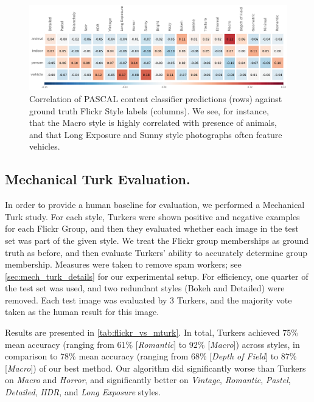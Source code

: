 \begin{figure}[h]
\centering
    \includegraphics[width=\linewidth]{../style/figures/content_correlation2/pascal_on_flickr.pdf}
    \caption[Correlation of PASCAL content classifier predictions against ground truth Flickr Style labels.]{
        Correlation of PASCAL content classifier predictions (rows) against ground truth Flickr Style labels (columns).
        We see, for instance, that the Macro style is highly correlated with presence of animals, and that Long Exposure and Sunny style photographs often feature vehicles.
    }\label{fig:content_correlation}
\end{figure}

\subsection{Mechanical Turk Evaluation.}\label{sec:mech_turk_evaluation}
In order to provide a human baseline for evaluation, we performed a Mechanical Turk study.
For each style, Turkers were shown positive and negative examples for each Flickr Group, and then they evaluated whether each image in the test set was part of the given style.
We treat the Flickr group memberships as ground truth as before, and then evaluate Turkers' ability to accurately determine group membership.
Measures were taken to remove spam workers; see \autoref{sec:mech_turk_details} for our experimental setup.
For efficiency, one quarter of the test set was used, and two redundant styles (Bokeh and Detailed) were removed.
Each test image was evaluated by 3 Turkers, and the majority vote taken as the human result for this image.

Results are presented in \autoref{tab:flickr_vs_mturk}.
In total, Turkers achieved 75\% mean accuracy (ranging from 61\% [\emph{Romantic}] to 92\% [\emph{Macro}]) across styles, in comparison to 78\% mean accuracy (ranging from 68\% [\emph{Depth of Field}] to 87\% [\emph{Macro}]) of our best method.
Our algorithm did significantly worse than Turkers on \emph{Macro} and \emph{Horror}, and significantly better on \emph{Vintage}, \emph{Romantic}, \emph{Pastel}, \emph{Detailed}, \emph{HDR}, and \emph{Long Exposure} styles.

